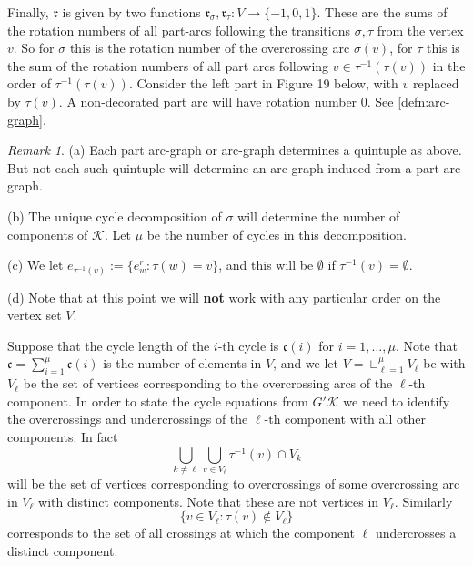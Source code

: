 \documentclass[11pt]{article}
\theoremstyle{definition}
\theoremstyle{remark}
\newtheorem*{rem}{Remark}
\theoremstyle{remark}
\begin{document}
Finally, $\mathfrak{r}$ is given by two functions $\mathfrak{r}_{\sigma },\mathfrak{r}_{\tau }: V\rightarrow \{-1,0,1\}$. These are the sums of the rotation numbers of all part-arcs following the transitions $\sigma ,\tau $ from the vertex $v$. So for $\sigma $ this is the rotation number of the overcrossing arc $\sigma (v)$, for $\tau $ this is the sum of the rotation numbers of all part arcs following $v\in \tau^{-1}(\tau (v))$ in the order of $\tau^{-1}(\tau (v))$. Consider the left part in Figure 19 below, with $v$ replaced by $\tau (v)$. 
A non-decorated part arc will have rotation number $0$. See \ref{defn:arc-graph}.

\begin{rem} (a) Each part arc-graph or arc-graph determines a quintuple as above. But not each such quintuple will determine an arc-graph induced from a part arc-graph. 

\noindent (b) The unique cycle decomposition of $\sigma $ will determine the number of components of $\mathcal{K}$. Let $\mu $ be the number of cycles in this decomposition. 

\noindent (c) We let $e_{\tau^{-1}(v)}:=\{e_w^r:\tau (w)=v\}$, and this will be $\emptyset $ if $\tau^{-1}(v)=\emptyset $.

\noindent (d)  Note that at this point we will \textbf{not} work with any particular order on the vertex set $V$. 

\end{rem}

Suppose that the cycle length of the $i$-th cycle is $\mathfrak{c}(i)$ for $i=1,\ldots ,\mu $. Note that 
$\mathfrak{c}=\sum_{i=1}^{\mu }\mathfrak{c}(i)$ is the number of elements in $V$, and we let $V=\sqcup_{\ell =1}^{\mu }V_{\ell }$ be with $V_{\ell }$ be the set of vertices corresponding to the overcrossing arcs of the $\ell $-th component. 
In order to state the cycle equations from $G'\mathcal{K}$ we need to identify the overcrossings and undercrossings of the $\ell $-th component with all other components. In fact
$$\bigcup_{k\neq \ell }\bigcup_{v\in V_{\ell }} \tau^{-1}(v)\cap V_k$$
will be the set of vertices corresponding to overcrossings of some  overcrossing arc in $V_{\ell }$ with distinct components. 
Note that these are not vertices in $V_{\ell }$. 
Similarly
$$\{v\in V_{\ell }: \tau (v)\notin V_{\ell }\}$$
corresponds to the set of all crossings at which the component $\ell $ undercrosses a distinct component.
 
\end{document}
